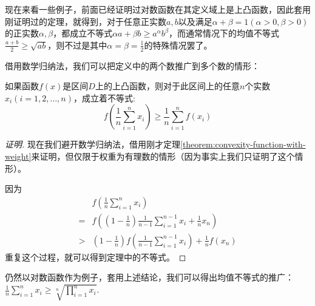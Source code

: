 现在来看一些例子，前面已经证明过对数函数在其定义域上是上凸函数，因此套用刚证明过的定理，就得到，对于任意正实数$a,b$以及满足$\alpha+\beta=1(\alpha>0,\beta>0)$的正实数$\alpha,\beta$，都成立不等式$\alpha a + \beta b \geqslant a^{\alpha}b^{\beta}$，而通常情况下的均值不等式$\frac{a+b}{2}\geqslant \sqrt{ab}$，则不过是其中$\alpha=\beta=\frac{1}{2}$的特殊情况罢了。

借用数学归纳法，我们可以把定义中的两个数推广到多个数的情形：
\begin{theorem}
  \label{theorem:convexity-function-multile}
如果函数$f(x)$是区间$D$上的上凸函数，则对于此区间上的任意$n$个实数$x_i(i=1,2,\ldots,n)$，成立着不等式:
\begin{equation}
  \label{eq:convexity-function-multile}
  f(\frac{1}{n}\sum_{i=1}^nx_i) \geqslant \frac{1}{n}\sum_{i=1}^nf(x_i)
\end{equation}
\end{theorem}

\begin{proof}[证明]
  现在我们避开数学归纳法，借用刚才定理\ref{theorem:convexity-function-with-weight}来证明，但仅限于权重为有理数的情形（因为事实上我们只证明了这个情形）。

因为
\begin{equation*}
  \begin{split}
    & f \left ( \frac{1}{n}\sum_{i=1}^nx_i \right) \\
 = & f \left( (1-\frac{1}{n}) \frac{1}{n-1}\sum_{i=1}^{n-1}x_i + \frac{1}{n}x_n \right) \\
 > & (1-\frac{1}{n}) f \left( \frac{1}{n-1}\sum_{i=1}^{n-1}x_i \right) + \frac{1}{n} f(x_n)
  \end{split}
\end{equation*}
重复这个过程，就可以得到定理中的不等式。
\end{proof}

仍然以对数函数作为例子，套用上述结论，我们可以得出均值不等式的推广：$\frac{1}{n}\sum_{i=1}^nx_i \geqslant \sqrt[n]{\prod_{i=1}^nx_i}$.

